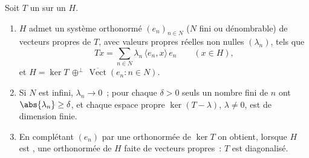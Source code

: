 \begin{theorem}\label{thm:b3:spectral:spectral}
Soit $T$ un   sur un  $H$.
\begin{enumerate}
  \item $H$ admet un système orthonormé $(e_n)_{n \in N}$
        ($N$ fini ou dénombrable) de vecteurs propres de $T$,
        avec valeurs propres réelles non nulles
        $(\lambda_n)$, tels que
        \[
        Tx = \sum_{n\in N}\lambda_n\,\langle e_n, x\rangle\,
        e_n \qquad (x \in H),
        \]
        et $H = \ker T \,\oplus^\perp\,
        \overline{\operatorname{Vect}}(e_n : n \in N)$.
  \item Si $N$ est infini, $\lambda_n \to 0$~; pour chaque
        $\delta > 0$ seuls un nombre fini de $n$ ont
        $\abs{\lambda_n} \geq \delta$, et chaque espace
        propre $\ker(T - \lambda)$, $\lambda \neq 0$, est de
        dimension finie.
  \item En complétant $(e_n)$ par une  orthonormée de
        $\ker T$ on obtient, lorsque $H$ est , une
         orthonormée de $H$ faite de vecteurs propres~:
        $T$ est diagonalisé.
\end{enumerate}
\end{theorem}

